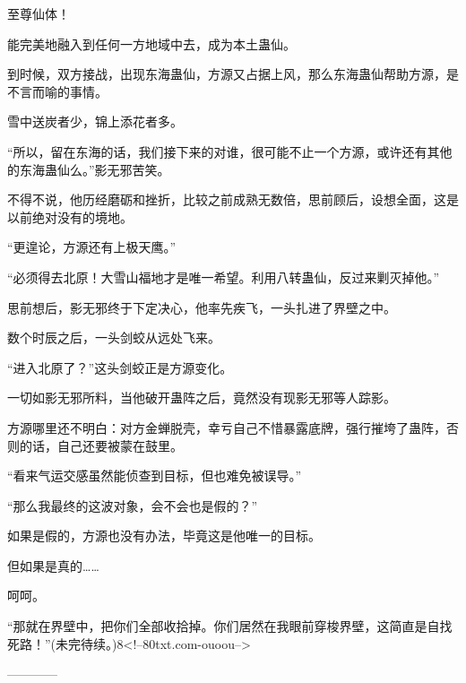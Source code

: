 \begin{this_body}
至尊仙体！

能完美地融入到任何一方地域中去，成为本土蛊仙。

到时候，双方接战，出现东海蛊仙，方源又占据上风，那么东海蛊仙帮助方源，是不言而喻的事情。

雪中送炭者少，锦上添花者多。

“所以，留在东海的话，我们接下来的对谁，很可能不止一个方源，或许还有其他的东海蛊仙么。”影无邪苦笑。

不得不说，他历经磨砺和挫折，比较之前成熟无数倍，思前顾后，设想全面，这是以前绝对没有的境地。

“更遑论，方源还有上极天鹰。”

“必须得去北原！大雪山福地才是唯一希望。利用八转蛊仙，反过来剿灭掉他。”

思前想后，影无邪终于下定决心，他率先疾飞，一头扎进了界壁之中。

数个时辰之后，一头剑蛟从远处飞来。

“进入北原了？”这头剑蛟正是方源变化。

一切如影无邪所料，当他破开蛊阵之后，竟然没有现影无邪等人踪影。

方源哪里还不明白：对方金蝉脱壳，幸亏自己不惜暴露底牌，强行摧垮了蛊阵，否则的话，自己还要被蒙在鼓里。

“看来气运交感虽然能侦查到目标，但也难免被误导。”

“那么我最终的这波对象，会不会也是假的？”

如果是假的，方源也没有办法，毕竟这是他唯一的目标。

但如果是真的……

呵呵。

“那就在界壁中，把你们全部收拾掉。你们居然在我眼前穿梭界壁，这简直是自找死路！”(未完待续。)8<!--80txt.com-ouoou-->

------------

\end{this_body}

